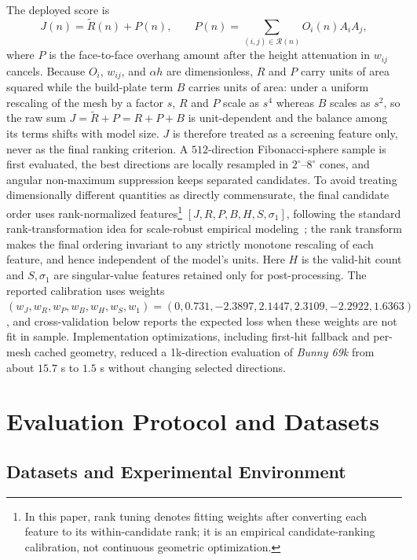 \documentclass[11pt,a4paper]{article}
\begin{document}
The deployed score is
\begin{equation}
J(n)=\tilde R(n)+P(n),\qquad
P(n)=\sum_{(i,j)\in\mathcal{R}(n)}O_i(n)A_iA_j,
\end{equation}
where $P$ is the face-to-face overhang amount after the height attenuation in $w_{ij}$ cancels. Because $O_i$, $w_{ij}$, and $\alpha h$ are dimensionless, $R$ and $P$ carry units of area squared while the build-plate term $B$ carries units of area: under a uniform rescaling of the mesh by a factor $s$, $R$ and $P$ scale as $s^4$ whereas $B$ scales as $s^2$, so the raw sum $J=\tilde R+P=R+P+B$ is unit-dependent and the balance among its terms shifts with model size. $J$ is therefore treated as a screening feature only, never as the final ranking criterion. A $512$-direction Fibonacci-sphere sample is first evaluated, the best directions are locally resampled in $2^\circ$--$8^\circ$ cones, and angular non-maximum suppression keeps separated candidates. To avoid treating dimensionally different quantities as directly commensurate, the final candidate order uses rank-normalized features\footnote{In this paper, rank tuning denotes fitting weights after converting each feature to its within-candidate rank; it is an empirical candidate-ranking calibration, not continuous geometric optimization.} $[J,R,P,B,H,S,\sigma_1]$, following the standard rank-transformation idea for scale-robust empirical modeling~\cite{conover1981rank}; the rank transform makes the final ordering invariant to any strictly monotone rescaling of each feature, and hence independent of the model's units. Here $H$ is the valid-hit count and $S,\sigma_1$ are singular-value features retained only for post-processing. The reported calibration uses weights $(w_J,w_R,w_P,w_B,w_H,w_S,w_1)=(0,0.731,-2.3897,2.1447,2.3109,-2.2922,1.6363)$, and cross-validation below reports the expected loss when these weights are not fit in sample. Implementation optimizations, including first-hit fallback and per-mesh cached geometry, reduced a 1k-direction evaluation of \emph{Bunny 69k} from about $15.7$ s to $1.5$ s without changing selected directions.

\section{Evaluation Protocol and Datasets}

\subsection{Datasets and Experimental Environment}
\label{sec:datasets}
\end{document}
